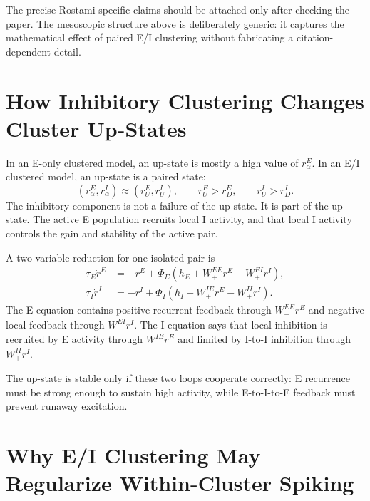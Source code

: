 The precise Rostami-specific claims should be attached only after checking the paper. The mesoscopic structure above is deliberately generic: it captures the mathematical effect of paired E/I clustering without fabricating a citation-dependent detail.

\section{How Inhibitory Clustering Changes Cluster Up-States}
\label{sec:inhibitory-clustering-changes-upstates}

In an E-only clustered model, an up-state is mostly a high value of $r_{\alpha}^{E}$. In an E/I clustered model, an up-state is a paired state:
%
\begin{equation}
  (r_{\alpha}^{E},r_{\alpha}^{I})
  \approx
  (r_U^E,r_U^I),
  \qquad
  r_U^E>r_D^E,
  \qquad
  r_U^I>r_D^I .
  \label{eq:paired-upstate}
\end{equation}
%
The inhibitory component is not a failure of the up-state. It is part of the up-state. The active E population recruits local I activity, and that local I activity controls the gain and stability of the active pair.

A two-variable reduction for one isolated pair is
%
\begin{align}
  \tau_E \dot r^E
  &=
  -r^E
  +
  \Phi_E(h_E+W_{+}^{EE}r^E-W_{+}^{EI}r^I),
  \label{eq:single-pair-e}\\
  \tau_I \dot r^I
  &=
  -r^I
  +
  \Phi_I(h_I+W_{+}^{IE}r^E-W_{+}^{II}r^I).
  \label{eq:single-pair-i}
\end{align}
%
The E equation contains positive recurrent feedback through $W_{+}^{EE}r^E$ and negative local feedback through $W_{+}^{EI}r^I$. The I equation says that local inhibition is recruited by E activity through $W_{+}^{IE}r^E$ and limited by I-to-I inhibition through $W_{+}^{II}r^I$.

The up-state is stable only if these two loops cooperate correctly: E recurrence must be strong enough to sustain high activity, while E-to-I-to-E feedback must prevent runaway excitation.

\section{Why E/I Clustering May Regularize Within-Cluster Spiking}
\label{sec:ei-clustering-regularize-spiking}

